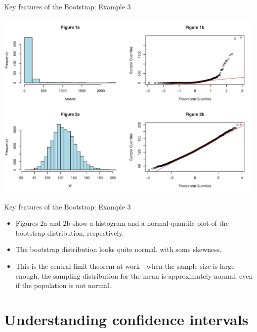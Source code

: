 \documentclass[
  ignorenonframetext,
]{beamer}
\begin{document}
\begin{frame}{Key features of the Bootstrap: Example 3}
\protect\hypertarget{key-features-of-the-bootstrap-example-3-2}{}
\tiny

\begin{center}\includegraphics[width=0.9\linewidth,height=0.85\textheight]{Week10A_files/figure-beamer/unnamed-chunk-7-1} \end{center}
\normalsize
\end{frame}

\begin{frame}{Key features of the Bootstrap: Example 3}
\protect\hypertarget{key-features-of-the-bootstrap-example-3-3}{}
\begin{itemize}
\item
  Figures 2a and 2b show a histogram and a normal quantile plot of the
  bootstrap distribution, respectively.
\item
  The bootstrap distribution looks quite normal, with some skewness.
\item
  This is the central limit theorem at work---when the sample size is
  large enough, the sampling distribution for the mean is approximately
  normal, even if the population is not normal.
\end{itemize}
\end{frame}

\hypertarget{understanding-confidence-intervals}{%
\section{Understanding confidence
intervals}\label{understanding-confidence-intervals}}
\end{document}

